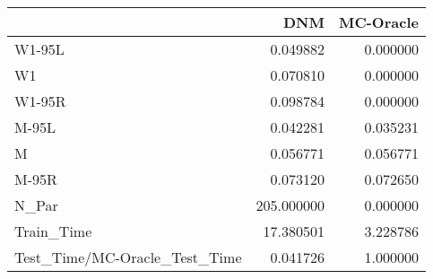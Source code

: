 \begin{tabular}{lrr}
\toprule
{} &         DNM &  MC-Oracle \\
\midrule
W1-95L                        &    0.049882 &   0.000000 \\
W1                            &    0.070810 &   0.000000 \\
W1-95R                        &    0.098784 &   0.000000 \\
M-95L                         &    0.042281 &   0.035231 \\
M                             &    0.056771 &   0.056771 \\
M-95R                         &    0.073120 &   0.072650 \\
N\_Par                         &  205.000000 &   0.000000 \\
Train\_Time                    &   17.380501 &   3.228786 \\
Test\_Time/MC-Oracle\_Test\_Time &    0.041726 &   1.000000 \\
\bottomrule
\end{tabular}
